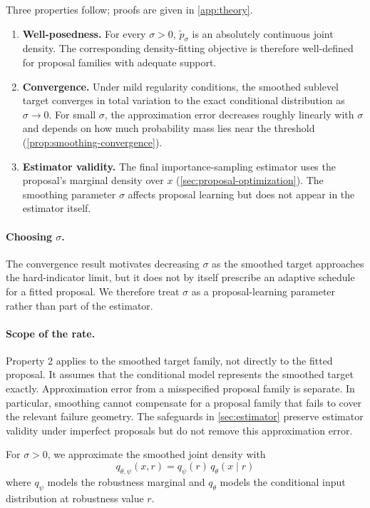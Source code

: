 \documentclass[twoside,11pt]{article}
\begin{document}
Three properties follow; proofs are given in \cref{app:theory}.
\begin{enumerate}
    \item \textbf{Well-posedness.}
    For every $\sigma>0$, $\tilde{p}_\sigma$ is an absolutely continuous joint density. The corresponding density-fitting objective is therefore well-defined for proposal families with adequate support.

    \item \textbf{Convergence.}
    Under mild regularity conditions, the smoothed sublevel target converges in total variation to the exact conditional distribution as $\sigma\to0$. For small $\sigma$, the approximation error decreases roughly linearly with $\sigma$ and depends on how much probability mass lies near the threshold (\cref{prop:smoothing-convergence}).

    \item \textbf{Estimator validity.}
    The final importance-sampling estimator uses the proposal's marginal density over $x$ (\cref{sec:proposal-optimization}). The smoothing parameter $\sigma$ affects proposal learning but does not appear in the estimator itself.
\end{enumerate}

\paragraph{Choosing $\sigma$.}
The convergence result motivates decreasing $\sigma$ as the smoothed target approaches the hard-indicator limit, but it does not by itself prescribe an adaptive schedule for a fitted proposal. We therefore treat $\sigma$ as a proposal-learning parameter rather than part of the estimator.

\paragraph{Scope of the rate.}
Property 2 applies to the smoothed target family, not directly to the fitted proposal. It assumes that the conditional model represents the smoothed target exactly. Approximation error from a misspecified proposal family is separate. In particular, smoothing cannot compensate for a proposal family that fails to cover the relevant failure geometry. The safeguards in \cref{sec:estimator} preserve estimator validity under imperfect proposals but do not remove this approximation error.

For $\sigma>0$, we approximate the smoothed joint density with
\begin{equation*}
    q_{\theta,\psi}(x,r)
    =
    q_{\psi}(r)\,q_{\theta}(x\mid r)
\end{equation*}
where $q_{\psi}$ models the robustness marginal and $q_{\theta}$ models the conditional input distribution at robustness value $r$.
\end{document}
